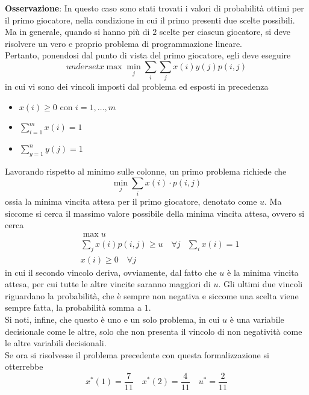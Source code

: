 \documentclass[a4paper]{extarticle}
\begin{document}
\vspace{2em}
\noindent
\textbf{Osservazione}: In questo caso sono stati trovati i valori di probabilità ottimi per il primo giocatore, nella condizione in cui il primo presenti due scelte possibili. Ma in generale, quando si hanno più di $2$ scelte per ciascun giocatore, si deve risolvere un vero e proprio problema di programmazione lineare.\\
Pertanto, ponendosi dal punto di vista del primo giocatore, egli deve eseguire
\[underset{x}{\max} \underset{j}{\min} \sum_i \sum_j x(i) y(j) p(i,j)\]
in cui vi sono dei vincoli imposti dal problema ed esposti in precedenza
\begin{itemize}
    \item $x(i) \geq 0$ con $i=1,\dots,m$
    \item $\displaystyle{\sum_{i=1}^m x(i) = 1}$
    \item $\displaystyle{\sum_{y=1}^n y(j) = 1}$
\end{itemize}
Lavorando rispetto al minimo sulle colonne, un primo problema richiede che
\[\underset{j}{\min} \sum_i x(i) \cdot p(i,j)\]
ossia la minima vincita attesa per il primo giocatore, denotato come $u$. Ma siccome si cerca il massimo valore possibile della minima vincita attesa, ovvero si cerca
\begin{align*}
    &\max u\\
    &\sum_j x(i) p(i,j) \geq u \hspace{1em} \forall j
    &\sum_i x(i)=1\\
    &x(i) \geq 0 \hspace{1em} \forall j
\end{align*}
in cui il secondo vincolo deriva, ovviamente, dal fatto che $u$ è la minima vincita attesa, per cui tutte le altre vincite saranno maggiori di $u$. Gli ultimi due vincoli riguardano la probabilità, che è sempre non negativa e siccome una scelta viene sempre fatta, la probabilità somma a $1$.\\
Si noti, infine, che questo è uno e un solo problema, in cui $u$ è una variabile decisionale come le altre, solo che non presenta il vincolo di non negatività come le altre variabili decisionali.\\
Se ora si risolvesse il problema precedente con questa formalizzazione si otterrebbe
\[x^*(1)=\dfrac{7}{11} \hspace{1em} x^*(2)=\dfrac{4}{11} \hspace{1em} u^*=\dfrac{2}{11}\]
\end{document}
